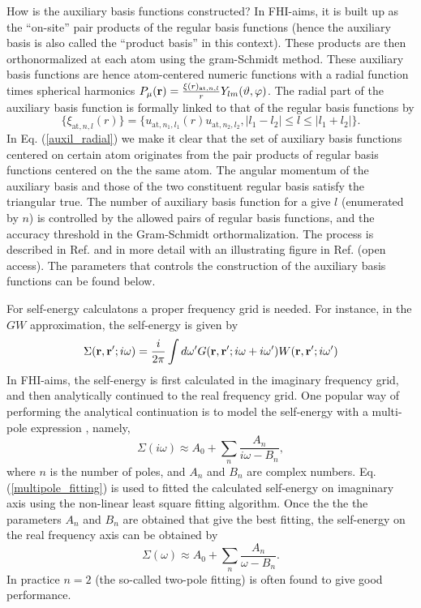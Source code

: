 How is the auxiliary basis functions constructed? In FHI-aims, it is  built 
up as the ``on-site'' pair products of the regular basis functions (hence
the auxiliary basis is also called the ``product basis'' in this context). 
These products are then orthonormalized at each atom using the gram-Schmidt 
method. These auxiliary basis functions are hence atom-centered numeric 
functions with a radial function times spherical harmonics 
 $P_{\mu}({\bf r}) = \frac{\xi(r)_{\text{at},n,l}}{r}Y_{lm}(\vartheta,\varphi)$. 
The radial part of the auxiliary basis function is 
formally linked to that of the regular basis functions by
  \begin{equation}
    \{\xi_{\text{at},n,l}(r)\} = \{u_{\text{at},n_1,l_1}(r)u_{\text{at},n_2,l_2},
     |l_1-l_2| \le l \le |l_1+l_2|  \}.
   \label{auxil_radial}
  \end{equation}
In Eq. (\ref{auxil_radial}) we make it clear that the set of auxiliary
basis functions centered on certain atom  originates from the pair
products of regular basis functions  
centered on the the same atom. The angular momentum of the auxiliary basis
and those of the two constituent regular basis satisfy the triangular 
true. The number of auxiliary basis function for a give $l$ 
(enumerated by $n$) is
controlled by the allowed pairs of regular basis functions, and the accuracy 
threshold in the Gram-Schmidt orthormalization. The process is
described in Ref. \cite{Ren12a} and in more detail with an
illustrating figure in Ref. \cite{Ihrig2015} (open access). The
parameters that controls the construction of the auxiliary basis
functions can be found below. 

For self-energy calculatons a proper frequency grid is needed. For instance,
in the $GW$ approximation, the self-energy is given by
  \begin{equation}
    \Sigma({\bf r, r^\prime};i\omega) = \frac{i}{2\pi} \int d\omega^\prime
     G({\bf r, r^{\prime}};i\omega+i\omega^\prime) 
    W({\bf r,r^\prime};i\omega^\prime)
   \label{GW_selfenergy}
  \end{equation}
In FHI-aims, the self-energy is first calculated in the imaginary frequency
grid, and then analytically continued to the real frequency grid. One popular 
way of performing the analytical continuation is to model the self-energy with
a multi-pole expression \cite{Rojas95}, namely,
    \begin{equation} 
       \Sigma(i\omega) \approx A_0 + \sum_n \frac{A_n}{i\omega - B_n},
      \label{multipole_fitting}
    \end{equation}
where $n$ is the number of poles, and $A_n$ and $B_n$ are complex numbers. 
Eq. (\ref{multipole_fitting}) is used to fitted the calculated self-energy
on imagninary axis using the non-linear least square fitting algorithm. Once the
the the parameters $A_n$ and $B_n$ are obtained that give the best fitting,
the self-energy on the real frequency axis can be obtained by
    \begin{equation}
       \Sigma(\omega) \approx A_0 + \sum_n \frac{A_n}{\omega - B_n}.
       \label{eq:multipole-real}
    \end{equation}
In practice $n=2$ (the so-called two-pole fitting) is often found to
give good performance. 

